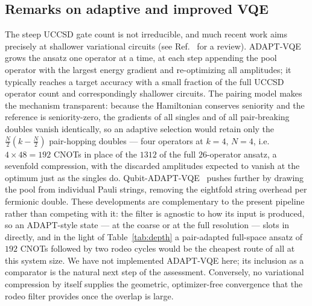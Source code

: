 \documentclass[
  aps,            %
  prc,            %
  reprint,        %
  superscriptaddress,
  floatfix,
  nofootinbib
]{revtex4-2}
\begin{document}
\subsection{Remarks on adaptive and improved VQE}
\label{sec:adapt}
The steep UCCSD gate count is not irreducible, and much recent work aims
precisely at shallower variational circuits (see Ref.~\cite{Tilly2022} for a
review).  ADAPT-VQE~\cite{Grimsley2019} grows the ansatz one operator at a
time, at each step appending the pool operator with the largest energy gradient
and re-optimizing all amplitudes; it typically reaches a target accuracy with a
small fraction of the full UCCSD operator count and correspondingly shallower
circuits.  The pairing model makes the mechanism transparent: because the
Hamiltonian conserves seniority and the reference is seniority-zero, the
gradients of all singles and of all pair-breaking doubles vanish identically,
so an adaptive selection would retain only the $\frac{N}{2}(k-\frac{N}{2})$
pair-hopping doubles --- four operators at $k=4$, $N=4$, i.e.\
$4\times48=192$ CNOTs in place of the $1312$ of the full $26$-operator ansatz,
a sevenfold compression, with the discarded amplitudes expected to vanish at
the optimum just as the singles do.  Qubit-ADAPT-VQE~\cite{Tang2021} pushes
further by drawing the pool from individual Pauli strings, removing the
eightfold string overhead per fermionic double.  These developments are
complementary to the present pipeline rather than competing with it: the
filter is agnostic to how its input is produced, so an ADAPT-style state
--- at the coarse or at the full resolution --- slots in directly, and in the
light of Table~\ref{tab:depth} a pair-adapted full-space ansatz of $192$ CNOTs
followed by two rodeo cycles would be the cheapest route of all at this system
size.  We have not implemented ADAPT-VQE here; its inclusion as a comparator is
the natural next step of the assessment.  Conversely, no variational
compression by itself supplies the geometric, optimizer-free convergence that
the rodeo filter provides once the overlap is large.
\end{document}
